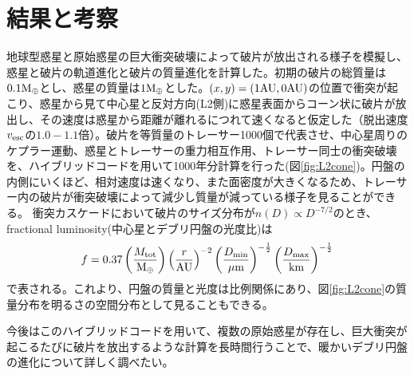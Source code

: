 \documentclass[a4paper,10pt,oneside,twocolumn,notitlepage,final]{jarticle}
\begin{document}

\section{結果と考察}
地球型惑星と原始惑星の巨大衝突破壊によって破片が放出される様子を模擬し、惑星と破片の軌道進化と破片の質量進化を計算した。初期の破片の総質量は$0.1 {\rm M_{\oplus}}$とし、惑星の質量は$1 {\rm M_{\oplus}}$とした。$(x,y) = (1 {\rm AU},0 {\rm AU})$の位置で衝突が起こり、惑星から見て中心星と反対方向(L2側)に惑星表面からコーン状に破片が放出し、その速度は惑星から距離が離れるにつれて速くなると仮定した（脱出速度$v_{\rm esc}$の$1.0-1.1$倍）。破片を等質量のトレーサー1000個で代表させ、中心星周りのケプラー運動、惑星とトレーサーの重力相互作用、トレーサー同士の衝突破壊を、ハイブリッドコードを用いて1000年分計算を行った(図\ref{fig:L2cone})。円盤の内側にいくほど、相対速度は速くなり、また面密度が大きくなるため、トレーサー内の破片が衝突破壊によって減少し質量が減っている様子を見ることができる。
衝突カスケードにおいて破片のサイズ分布が$n(D) \propto D^{-7/2}$のとき、fractional luminosity(中心星とデブリ円盤の光度比)は
\begin{align}
 f = 0.37 \left(\frac{M_{\rm tot}}{\rm M_{\oplus}}\right) \left(\frac{r}{\rm AU}\right)^{-2} \left(\frac{D_{\rm min}}{\rm \mu m}\right)^{-\frac{1}{2}} \left(\frac{D_{\rm max}}{\rm km}\right)^{-\frac{1}{2}}
\end{align}
で表される\citep{Jackson2012}。これより、円盤の質量と光度は比例関係にあり、図\ref{fig:L2cone}の質量分布を明るさの空間分布として見ることもできる。

今後はこのハイブリッドコードを用いて、複数の原始惑星が存在し、巨大衝突が起こるたびに破片を放出するような計算を長時間行うことで、暖かいデブリ円盤の進化について詳しく調べたい。


\end{document}
